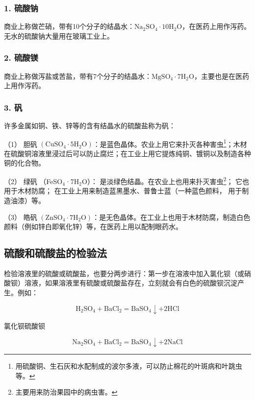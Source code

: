 \subsubsection{1. 硫酸钠}

商业上称做芒硝，带有10个分子的结晶水：\(\mathrm{Na}_{2} \mathrm{SO}_{4} \cdot 10 \mathrm{H}_{2} \mathrm{O}\)，在医药上用作泻药。无水的硫酸钠大量用在玻璃工业上。

\subsubsection{2. 硫酸镁}

商业上称做泻盐或苦盐，带有7个分子的结晶水：\(\mathrm{MgSO_4 \cdot 7H_2O}\)，主要也是在医药上用作泻药。

\subsubsection{3. 矾}

许多金属如铜、铁、锌等的含有结晶水的硫酸盐称为矾：

（1） 胆矾
\(\left(\mathrm{CuSO}_{4}\cdot5\mathrm{H}_{2}\mathrm{O}\right)\)：是蓝色晶体。农业上用它来扑灭各种害虫\footnote{用硫酸铜、生石灰和水配制成的波尔多液，可以防止棉花的叶斑病和叶跳虫等。}；木材在硫酸铜溶液里浸过后可以防止腐烂；在工业上用它提炼纯铜、镀铜以及制造各种铜的化合物。

（2） 绿矾 （FeSO\(_{4}\)·7H\(_{2}\)O）：
是淡绿色结晶。在农业上也用来扑灭害虫\footnote{主要用来防治果园中的病虫害。}；
它也用于木材防腐； 在工业上用来制造蓝黑墨水、普鲁士蓝（一种蓝色颜料，
用于制造油漆）等。

（3） 皓矾
\(\left(\mathrm{ZnSO}_{4}\cdot7\mathrm{H}_{2}\mathrm{O}\right)\)：是无色晶体。在工业上也用于木材防腐，制造白色颜料（例如锌白即氧化锌）等，在医药上用以配制眼药水。

\subsection{硫酸和硫酸盐的检验法}

检验溶液里的硫酸或硫酸盐，也要分两步进行：第一步在溶液中加入氯化钡（或硝酸钡）溶液，如果溶液里有硫酸或硫酸盐存在，立刻就会有白色的硫酸钡沉淀产生。例如：

\[
\mathrm{H} _ {2} \mathrm{SO} _ {4} + \mathrm{BaCl} _ {2} = \mathrm{BaSO} _ {4} \downarrow + 2 \mathrm{HCl}
\]

氯化钡硫酸钡

\[
\mathrm{Na} _ {2} \mathrm{SO} _ {4} + \mathrm{BaCl} _ {2} = \mathrm{BaSO} _ {4} \downarrow + 2 \mathrm{NaCl}
\]

